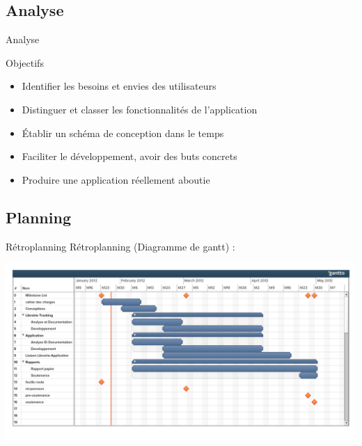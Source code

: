 \documentclass{beamer}
\begin{document}
      \subsection{Analyse}
            \begin{frame}{Analyse}
                  \begin{exampleblock}{Objectifs}
                        \begin{itemize}
                              \item{Identifier les besoins et envies des utilisateurs}
                              \item{Distinguer et classer les fonctionnalités de l'application}
                              \item{Établir un schéma de conception dans le temps}
                              \item{Faciliter le développement, avoir des buts concrets}
                              \item{Produire une application réellement aboutie}
                        \end{itemize}
                  \end{exampleblock}
            \end{frame}
      
      \subsection{Planning}
            \begin{frame}{Rétroplanning}      
                  Rétroplanning (Diagramme de gantt) :
                  \begin{center}
                  \includegraphics[scale=0.25]{../feuille-route/retroplanning.pdf}
                  \end{center}
            \end{frame}
\end{document}
